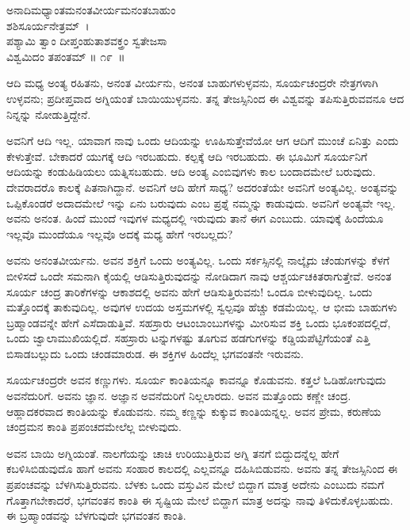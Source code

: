 \begin{shloka}
ಅನಾದಿಮಧ್ಯಾಂತಮನಂತವೀರ್ಯಮನಂತಬಾಹುಂ\\ ಶಶಿಸೂರ್ಯನೇತ್ರಮ್~।\\ಪಶ್ಯಾಮಿ ತ್ವಾಂ ದೀಪ್ತಂಹುತಾಶವಕ್ತ್ರಂ ಸ್ವತೇಜಸಾ\\ ವಿಶ್ವಮಿದಂ ತಪಂತಮ್ \hfill॥ ೧೯~॥
\end{shloka}

\begin{artha}
ಆದಿ ಮಧ್ಯ ಅಂತ್ಯ ರಹಿತನು, ಅನಂತ ವೀರ್ಯನು, ಅನಂತ ಬಾಹುಗಳುಳ್ಳವನು, ಸೂರ್ಯ\-ಚಂದ್ರರೇ ನೇತ್ರಗಳಾಗಿ ಉಳ್ಳವನು; ಪ್ರದೀಪ್ತವಾದ ಅಗ್ನಿಯಂತೆ ಬಾಯಿಯುಳ್ಳವನು. ತನ್ನ ತೇಜಸ್ಸಿನಿಂದ ಈ ವಿಶ್ವವನ್ನು ತಪಿಸುತ್ತಿರುವವನೂ ಆದ ನಿನ್ನನ್ನು ನೋಡುತ್ತಿದ್ದೇನೆ.
\end{artha}

ಅವನಿಗೆ ಆದಿ ಇಲ್ಲ. ಯಾವಾಗ ನಾವು ಒಂದು ಆದಿಯನ್ನು ಊಹಿಸುತ್ತೇವೆಯೋ ಆಗ ಆದಿಗೆ ಮುಂಚೆ ಏನಿತ್ತು ಎಂದು ಕೇಳುತ್ತೇವೆ. ಬೇಕಾದರೆ ಯುಗಕ್ಕೆ ಆದಿ ಇರಬಹುದು. ಕಲ್ಪಕ್ಕೆ ಆದಿ ಇರಬಹುದು. ಈ ಭೂಮಿಗೆ ಸೂರ್ಯನಿಗೆ ಆದಿಯನ್ನು ಕಂಡುಹಿಡಿಯಲು ಯತ್ನಿಸಬಹುದು. ಆದಿ ಅಂತ್ಯ ಎಂಬಿವುಗಳು ಕಾಲ ಬಂದಾದಮೇಲೆ ಬರುವುದು. ದೇವರಾದರೊ ಕಾಲಕ್ಕೆ ಪಿತನಾಗಿದ್ದಾನೆ. ಅವನಿಗೆ ಆದಿ ಹೇಗೆ ಸಾಧ್ಯ? ಅದರಂತೆಯೇ ಅವನಿಗೆ ಅಂತ್ಯವಿಲ್ಲ. ಅಂತ್ಯವನ್ನು ಒಪ್ಪಿಕೊಂಡರೆ ಅದಾದಮೇಲೆ ಇನ್ನು ಏನು ಬರುವುದು ಎಂಬ ಪ್ರಶ್ನೆ ನಮ್ಮನ್ನು ಕಾಡುವುದು. ಅವನಿಗೆ ಅಂತ್ಯವೇ ಇಲ್ಲ. ಅವನು ಅನಂತ. ಹಿಂದೆ ಮುಂದೆ ಇವುಗಳ ಮಧ್ಯದಲ್ಲಿ ಇರುವುದು ತಾನೆ ಈಗ ಎಂಬುದು. ಯಾವುಕ್ಕೆ ಹಿಂದೆಯೂ ಇಲ್ಲವೊ ಮುಂದೆಯೂ ಇಲ್ಲವೊ ಅದಕ್ಕೆ ಮಧ್ಯ ಹೇಗೆ ಇರಬಲ್ಲದು?

ಅವನು ಅನಂತವೀರ್ಯನು. ಅವನ ಶಕ್ತಿಗೆ ಒಂದು ಅಂತ್ಯವಿಲ್ಲ. ಒಂದು ಸರ್ಕಸ್ಸಿನಲ್ಲಿ ನಾಲ್ಕೈದು ಚೆಂಡುಗಳನ್ನು ಕೆಳಗೆ ಬೀಳಿಸದೆ ಒಂದೇ ಸಮನಾಗಿ ಕೈಯಲ್ಲಿ ಆಡಿಸುತ್ತಿರುವುದನ್ನು ನೋಡಿದಾಗ ನಾವು ಆಶ್ಚರ್ಯಚಕಿತರಾಗುತ್ತೇವೆ. ಅನಂತ ಸೂರ್ಯ ಚಂದ್ರ ತಾರಿಕೆಗಳನ್ನು ಆಕಾಶದಲ್ಲಿ ಅವನು ಹೇಗೆ ಆಡಿಸುತ್ತಿರುವನು! ಒಂದೂ ಬೀಳುವುದಿಲ್ಲ. ಒಂದು ಮತ್ತೊಂದಕ್ಕೆ ತಾಕುವುದಿಲ್ಲ. ಅವುಗಳ ಉದಯ ಅಸ್ತಮಗಳಲ್ಲಿ ಸ್ವಲ್ಪವೂ ಹೆಚ್ಚು ಕಡಮೆಯಿಲ್ಲ. ಆ ಭೀಮ ಬಾಹುಗಳು ಬ್ರಹ್ಮಾಂಡವನ್ನೇ ಹೇಗೆ ಎಸೆದಾಡುತ್ತಿವೆ. ಸಹಸ್ರಾರು ಆಟಂಬಾಂಬುಗಳನ್ನು ಮೀರಿಸುವ ಶಕ್ತಿ ಒಂದು ಭೂಕಂಪದಲ್ಲಿದೆ, ಒಂದು ಜ್ವಾಲಾಮುಖಿಯಲ್ಲಿದೆ. ಸಹಸ್ರಾರು ಟನ್ನುಗಳಷ್ಟು ತೂಗುವ ಹಡಗುಗಳನ್ನು ಕಡ್ಡಿಯಪೆಟ್ಟಿಗೆಯಂತೆ ಎತ್ತಿ ಬಿಸಾಡಬಲ್ಲುದು ಒಂದು ಚಂಡಮಾರುಡ. ಈ ಶಕ್ತಿಗಳ ಹಿಂದೆಲ್ಲ ಭಗವಂತನೇ ಇರುವನು.

ಸೂರ್ಯಚಂದ್ರರೇ ಅವನ ಕಣ್ಣುಗಳು. ಸೂರ್ಯ ಕಾಂತಿಯನ್ನೂ ಕಾವನ್ನೂ ಕೊಡುವನು. ಕತ್ತಲೆ ಓಡಿಹೋಗುವುದು ಅವನೆದುರಿಗೆ. ಅವನು ಜ್ಞಾನ. ಅಜ್ಞಾನ ಅವನೆದುರಿಗೆ ನಿಲ್ಲಲಾರದು. ಅವನ ಮತ್ತೊಂದು ಕಣ್ಣೇ ಚಂದ್ರ. ಆಹ್ಲಾದಕರವಾದ ಕಾಂತಿಯನ್ನು ಕೊಡುವನು. ನಮ್ಮ ಕಣ್ಣನ್ನು ಕುಕ್ಕುವ ಕಾಂತಿಯನ್ನಲ್ಲ. ಅವನ ಪ್ರೇಮ, ಕರುಣೆಯ ಚಂದ್ರಮನ ಕಾಂತಿ ಪ್ರಪಂಚದಮೇಲೆಲ್ಲ ಬೀಳುವುದು.

ಅವನ ಬಾಯಿ ಅಗ್ನಿಯಂತೆ. ನಾಲಗೆಯನ್ನು ಚಾಚಿ ಉರಿಯುತ್ತಿರುವ ಅಗ್ನಿ ತನಗೆ ಬಿದ್ದುದ\-ನ್ನೆಲ್ಲ ಹೇಗೆ ಕಬಳಿಸಿಬಿಡುವುದೊ ಹಾಗೆ ಅವನು ಸಂಹಾರ ಕಾಲದಲ್ಲಿ ಎಲ್ಲವನ್ನೂ ದಹಿಸಿಬಿಡುವನು. ಅವನು ತನ್ನ ತೇಜಸ್ಸಿನಿಂದ ಈ ಪ್ರಪಂಚವನ್ನು ಬೆಳಗಿಸುತ್ತಿರುವನು. ಬೆಳಕು ಒಂದು ವಸ್ತುವಿನ ಮೇಲೆ ಬಿದ್ದಾಗ ಮಾತ್ರ ಅದೇನು ಎಂಬುದು ನಮಗೆ ಗೊತ್ತಾಗಬೇಕಾದರೆ, ಭಗವಂತನ ಕಾಂತಿ ಈ ಸೃಷ್ಟಿಯ ಮೇಲೆ ಬಿದ್ದಾಗ ಮಾತ್ರ ಅದನ್ನು ನಾವು ತಿಳಿದುಕೊಳ್ಳಬಹುದು. ಈ ಬ್ರಹ್ಮಾಂಡವನ್ನು ಬೆಳಗುವುದೇ ಭಗವಂತನ ಕಾಂತಿ.

